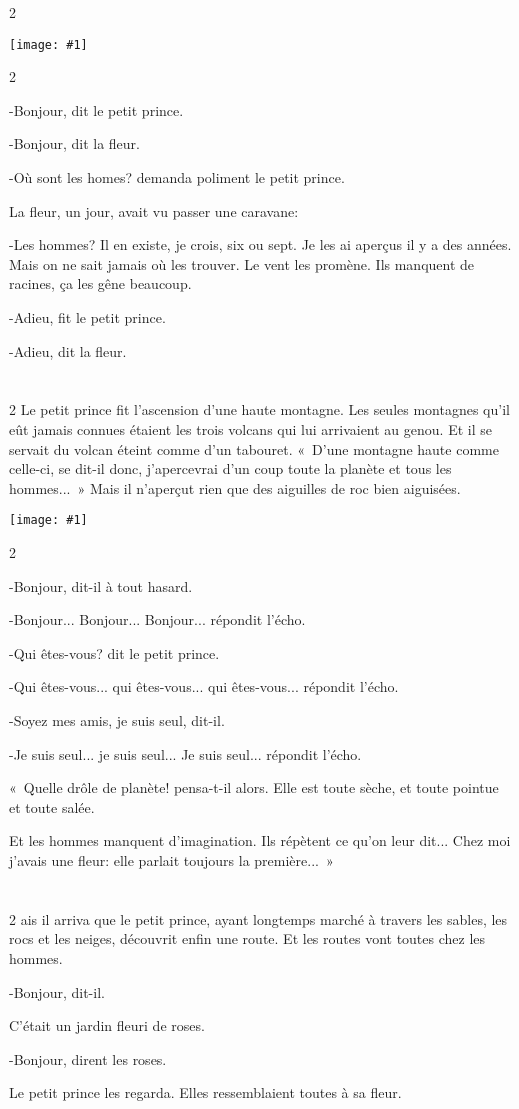 \documentclass{report}
\newcommand{\parachapter}[2][]{\end{paracol}\chapter[#1]{#2}\begin{paracol}{2}}
\newcommand{\incpic}[1]{%
\end{paracol}
\begin{center}
    \texttt{[image: \#1]}
\end{center}
\begin{paracol}{2}}
\begin{document}
\begin{paracol}{2}
\incpic{pic/image34.jpeg}

-Bonjour, dit le petit prince.

-Bonjour, dit la fleur.

-Où sont les homes? demanda poliment le petit prince.

La fleur, un jour, avait vu passer une caravane:

-Les hommes? Il en existe, je crois, six ou sept. Je les ai aperçus il y a des années. Mais on ne sait jamais où les trouver. Le vent les promène. Ils manquent de racines, ça les gêne beaucoup.

-Adieu, fit le petit prince.

-Adieu, dit la fleur.
\parachapter{} %
Le petit prince fit l'ascension d'une haute montagne. Les seules montagnes qu'il eût jamais connues étaient les trois volcans qui lui arrivaient au genou. Et il se servait du volcan éteint comme d'un tabouret. «~D'une montagne haute comme celle-ci, se dit-il donc, j'apercevrai d'un coup toute la planète et tous les hommes...~» Mais il n'aperçut rien que des aiguilles de roc bien aiguisées.

\incpic{pic/image35.png}

-Bonjour, dit-il à tout hasard.

-Bonjour... Bonjour... Bonjour... répondit l'écho.

-Qui êtes-vous? dit le petit prince.

-Qui êtes-vous... qui êtes-vous... qui êtes-vous... répondit l'écho.

-Soyez mes amis, je suis seul, dit-il.

-Je suis seul... je suis seul... Je suis seul... répondit l'écho.

«~Quelle drôle de planète! pensa-t-il alors. Elle est toute sèche, et toute pointue et toute salée.

Et les hommes manquent d'imagination. Ils répètent ce qu'on leur dit... Chez moi j'avais une fleur: elle parlait toujours la première...~»
\parachapter{} %
ais il arriva que le petit prince, ayant longtemps marché à travers les sables, les rocs et les neiges, découvrit enfin une route. Et les routes vont toutes chez les hommes.

-Bonjour, dit-il.

C'était un jardin fleuri de roses.

-Bonjour, dirent les roses.

Le petit prince les regarda. Elles ressemblaient toutes à sa fleur.


\end{paracol}
\end{document}
